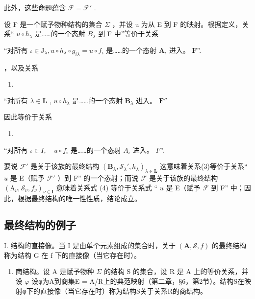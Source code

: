 此外，这些命题蕴含 \(\mathcal{F} = \mathcal{F}'\) .

设 F 是一个赋予物种结构的集合 \(\Sigma\) ，并设 u 为从 E 到 F 的映射。根据定义，关系“ \(u \circ h_{\lambda}\) 是……的一个态射 \(B_{\lambda}\) 到 F 中”等价于关系

``对所有 \(\iota\in\mathrm{J}_{\lambda}, u\circ h_{\lambda}\circ g_{i\lambda}=u\circ f_{\iota}\) 是……的一个态射 \(\mathbf{A}_{\iota}\) 进入。 \(\mathbf{F}\)''.

，以及关系

\begin{enumerate}
\def\labelenumi{(\arabic{enumi})}
\setcounter{enumi}{2}
\tightlist
\item
\end{enumerate}

``对所有 \(\lambda \in \mathbf{L}\) , \(u \circ h_{\lambda}\) 是……的一个态射 \(\mathbf{B}_{\lambda}\) 进入。 \(\mathbf{F}''\)

因此等价于关系

\begin{enumerate}
\def\labelenumi{(\arabic{enumi})}
\setcounter{enumi}{3}
\tightlist
\item
\end{enumerate}

``对所有 \(\iota\in I,\quad u\circ f_{i}\) 是……的一个态射 \(A_{\iota}\) 进入。 \(F\)''.

要说 \(\mathcal{F}'\) 是关于该族的最终结构 \((\mathbf{B}_{\lambda},\mathcal{S}_{\lambda}',h_{\lambda})_{\lambda \in \mathbf{L}}\) 这意味着关系(3)等价于关系“ \(u\) 是 E（赋予 \(\mathcal{F}'\) ）到 F'' 的一个态射；而说 \(\mathcal{F}\) 是关于该族的最终结构 \((\mathrm{A}_{\nu},\mathcal{S}_{\nu},f_{\nu})_{\nu \in \mathbf{I}}\) 意味着关系式 (4) 等价于关系式 “ \(u\) 是 E（赋予 \(\mathcal{F}\) 到 F'' 中；因此，根据最终结构的唯一性性质，结论成立。

\subsection{最终结构的例子}

I. 结构的直接像。当 I 是由单个元素组成的集合时，关于 \((\mathbf{A}, \mathcal{S}, f)\) 的最终结构称为结构 G 在 f 下的直接像（当它存在时）。

\begin{enumerate}
\def\labelenumi{\Roman{enumi}.}
\setcounter{enumi}{1}
\tightlist
\item
  商结构。设 A 是赋予物种 \(\Sigma\) 的结构 S 的集合，设 R 是 A 上的等价关系，并设 \(\varphi\) 设φ为A到商集E = A/R上的典范映射（第二章，§6，第2节）。结构S在映射φ下的直接像（当它存在时）称为结构S关于关系R的商结构。
\end{enumerate}

